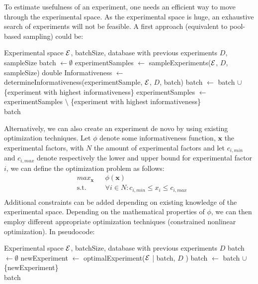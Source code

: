 \documentclass{article}
\begin{document}
To estimate usefulness of an experiment, one needs an efficient way to 
move through the experimental space. As the experimental space is huge, an exhaustive search of experiments will not be feasible. A first approach (equivalent to pool-based sampling) could be:

\setlength{\textfloatsep}{10pt}%

\begin{algorithmic}
\Require Experimental space $\mathcal{E}$, batchSize, database with previous experiments $D$, sampleSize
\State batch $\leftarrow \emptyset$
\State experimentSamples $\leftarrow$ sampleExperiments($\mathcal{E}$, $D$, sampleSize)
     \State double Informativeness $\leftarrow$ determineInformativeness(experimentSample, $\mathcal{E}$, $D$, batch)
   \EndFor
   \State batch $\leftarrow$ batch $\cup$ \{experiment with highest informativeness\}
   \State experimentSamples $\leftarrow$ experimentSamples $\setminus$ \{experiment with highest informativeness\}
   \EndWhile \\
   \Return batch
\EndFunction
\end{algorithmic}

Alternatively, we can also create an experiment de novo by using existing optimization techniques. Let $\phi$ denote some informativeness function, $\mathbf{x}$ the experimental factors, with $N$ the amount of experimental factors 
and let $c_{i,min}$ and $c_{i,max}$ denote respectively the lower and upper bound for experimental factor $i$, we can define the optimization problem as follows:
\begin{equation}\label{eq:opt_data_select}
 \begin{aligned}
  & max_{\mathbf{x}} & & \phi(\mathbf{x}) \\
  & \text{s.t.} & & \forall i \in N: c_{i,min} \leq x_i \leq c_{i,max} \\
 \end{aligned}
\end{equation}
Additional constraints can be added depending on existing knowledge of the experimental space.
Depending on the mathematical properties of $\phi$, we can then employ different appropriate optimization techniques (constrained nonlinear optimization).
In pseudocode:
\begin{algorithmic}
  \Require Experimental space $\mathcal{E}$, batchSize, database with previous experiments $D$
  \State  batch $\leftarrow \emptyset$ 
  \State newExperiment $\leftarrow$ optimalExperiment($\mathcal{E}$ | batch, $D$ )
  \State batch $\leftarrow$ batch $\cup$ \{newExperiment\}
  \EndWhile \\
  \Return batch
  \EndFunction
\end{algorithmic}


\end{document}
